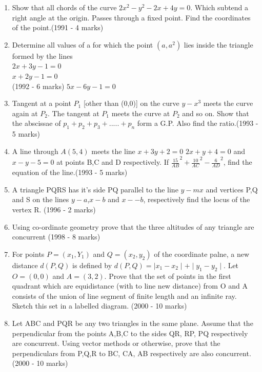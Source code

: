 \documentclass[12pt]{article}
\begin{document}
\begin{enumerate}
\newpage
\item Show that all chords of the curve  $2x^2-y^2-2x+4y=0$. Which subtend a right angle at the origin. Passes through a fixed point. Find the coordinates of the point.(1991 - 4 marks)\\
\item Determine all values of a for which the point $(a, a^2)$ lies inside the triangle formed by the lines\\
$2x+3y-1=0$\\
$x+2y-1=0$\\       (1992 - 6 marks)
$5x-6y-1=0$\\
\item Tangent at a point $P_1$ [other than (0,0)] on the curve $y-x^3$ meets the curve again at $P_2$. The tangent at $P_1$ meets the curve at $P_2$ and so on. Show that the abscissae of $p_1+p_2+p_3+.....+p_n$ form a G.P. Also find the ratio.(1993 - 5 marks)\\
\item A line through $A(5,4)$ meets the line $x+3y+2=0$ $2x+y+4=0$ and $x-y-5=0$ at points B,C and D respectively. If    $\frac{15}{AB}^2+\frac{10}{AC}^2-\frac{6}{AD}^2$, find the equation of the line.(1993 - 5 marks)\\
\item A triangle PQRS has it's side PQ parallel to the line $y-mx$ and vertices P,Q and S on the lines $y-a$,$ x-b$ and $x--b$, respectively find the locus of the vertex R. (1996 - 2 marks)\\
\item Using co-ordinate geometry prove that the three altitudes of any triangle are concurrent (1998 - 8 marks)\\
\item For points $P=(x_1,Y_1)$ and $Q=(x_2,y_2)$ of the coordinate palne, a new distance $d(P,Q)$ is defined by $d(P,Q)=\mid x_1-x_2\mid + \mid y_1-y_2\mid$. Let $O=(0,0)$  and $A=(3,2)$. Prove that the set of points in the first quadrant which are equidistance (with to line new distance) from O and A consists of the union of line segment of finite length and an infinite ray. Sketch this set in a labelled diagram. (2000 - 10 marks)\\
\item Let ABC and PQR be any two triangles in the same plane. Assume that the perpendicular from the points A,B,C to the sides QR, RP, PQ respectively are concurrent. Using vector methods or otherwise, prove that the perpendiculars from P,Q,R to BC, CA, AB  respectively are also concurrent. (2000 - 10 marks)\\

\end{enumerate}
\end{document}
